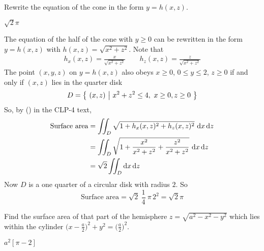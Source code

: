 \begin{hint}
Rewrite the equation of the cone in the form $y=h(x,z)$.
\end{hint}

\begin{answer}
$\sqrt{2}\pi$
\end{answer}

\begin{solution}
The equation of the half of the cone with $y\ge 0$ can be rewritten in the form 
$y=h(x,z)$ with $h(x,z)=\sqrt{x^2+z^2}$. Note that
\begin{align*}
h_x(x,z)=\frac{x}{\sqrt{x^2+z^2}}\qquad
h_z(x,z)=\frac{z}{\sqrt{x^2+z^2}}
\end{align*}
The point $(x,y,z)$ on $y=h(x,z)$ also obeys $x\ge 0$, $0\le y\le 2$, $z\ge 0$ if and only if $(x,z)$
lies in the quarter disk
\begin{equation*}
D = \big\{ \ (x,z)\ \big|\ x^2+z^2\le 4,\ x\ge 0, z\ge 0\ \big\}
\end{equation*}
So, by 
() in the CLP-4 text,
\begin{align*}
\text{Surface area}
&= \iint_{D}\sqrt{1+h_x(x,z)^2+h_z(x,z)^2}\ \mathrm{d}x\,\mathrm{d}z \\
&= \iint_{D}
    \sqrt{1+\frac{x^2}{x^2+z^2}+\frac{z^2}{x^2+z^2}}\ \mathrm{d}x\,\mathrm{d}z \\
&=\sqrt{2} \iint_{D} \mathrm{d}x\,\mathrm{d}z 
\end{align*}
Now $D$ is a one quarter of a circular disk with radius $2$.
So
\begin{equation*}
\text{Surface area} = \sqrt{2}\ \frac{1}{4}\ \pi\, 2^2 = \sqrt{2}\pi
\end{equation*}

\end{solution}


\begin{question} [M200 2001D] %
Find the surface area of that part of the hemisphere 
$z=\sqrt{a^2-x^2-y^2}$ which lies within the cylinder $\big(x-\frac{a}{2}\big)^2+y^2=\big(\frac{a}{2}\big)^2$.
\end{question}

%

\begin{answer}
$a^2[\pi-2]$
\end{answer}

